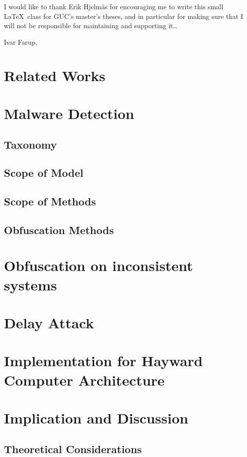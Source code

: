 \documentclass[medieteknikk]{gucmasterthesis}
\begin{document}
I would like to thank Erik Hjelmås for encouraging me to write this
small \LaTeX\ class for GUC's master's theses, and in particular for
making sure that I will not be responsible for maintaining and
supporting it\dots

\vspace{\baselineskip}
\noindent Ivar Farup, \gucmasterthesisdate
 
\tableofcontents
\listoffigures
\listoftables


\chapter{Related Works}
\chapter{Malware Detection}
\section{Taxonomy}
\section{Scope of Model}
\section{Scope of Methods}
\section{Obfuscation Methods}

\chapter{Obfuscation on inconsistent systems}
\chapter{Delay Attack}
\chapter{Implementation for Hayward Computer Architecture}
\chapter{Implication and Discussion}
\section{Theoretical Considerations}
\end{document}
